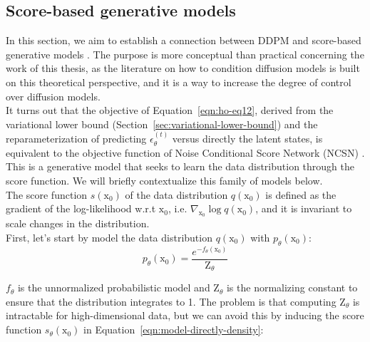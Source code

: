 \subsection{Score-based generative models}\label{sec:ddpm-as-score}


In this section, we aim to establish a connection between DDPM and score-based generative models \citep{song2020generative}\citep{song2020improved}\citep{song2021scorebased}. The purpose is more conceptual than practical concerning the work of this thesis, as the literature on how to condition diffusion models is built on this theoretical perspective, and it is a way to increase the degree of control over diffusion models. \\

\noindent It turns out that the objective of Equation~\ref{eqn:ho-eq12}, derived from the variational lower bound (Section~\ref{sec:variational-lower-bound}) and the reparameterization of predicting $\epsilon_{\theta}^{(t)}$ versus directly the latent states, is equivalent to the objective function of Noise Conditional Score Network (NCSN) \citep{song2020improved}. This is a generative model that seeks to learn the data distribution through the score function. We will briefly contextualize this family of models below. \\

\noindent The score function $s(\mathrm{x}_{0})$ of the data distribution $q(\mathrm{x}_{0})$ is defined as the gradient of the log-likelihood w.r.t $\mathrm{x}_{0}$, i.e. $\nabla_{\mathrm{x}_{0}}\log q(\mathrm{x}_{0})$, and it is invariant to scale changes in the distribution. \\

\noindent First, let's start by model the data distribution $q(\mathrm{x}_{0})$ with $p_{\theta}(\mathrm{x}_{0})$:
\begin{equation}\label{eqn:model-directly-density}
    p_{\theta}(\mathrm{x}_{0}) = \frac{e^{-f_{\theta}(\mathrm{x}_{0})}}{\mathrm{Z}_{\theta}} 
\end{equation}

\noindent $f_{\theta}$ is the unnormalized probabilistic model and $\mathrm{Z}_{\theta}$ is the normalizing constant to ensure that the distribution integrates to 1.  The problem is that computing $\mathrm{Z}_{\theta}$ is intractable for high-dimensional data, but we can avoid this by inducing the score function $s_{\theta}(\mathrm{x}_{0})$ in Equation~\ref{eqn:model-directly-density}: \\

